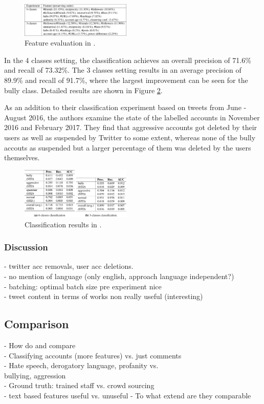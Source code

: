 \documentclass{proseminar}
\begin{document}
\begin{figure}
\centering
\includegraphics[width=0.47\textwidth]{img/twitter_features}
\caption{Feature evaluation in \cite{Twitter:2017}.}
\label{fig:twitter_features}
\end{figure}

In the 4 classes setting, the classification achieves an overall precision of 71.6\% and recall of 73.32\%. The 3 classes setting results in an average precision of 89.9\% and recall of 91.7\%, where the largest improvement can be seen for the bully class. Detailed results are shown in Figure \ref{fig:twitter_results}.

As an addition to their classification experiment based on tweets from June - August 2016, the authors examine the state of the labelled accounts in November 2016 and February 2017. They find that aggressive accounts got deleted by their users as well as suspended by Twitter to some extent, whereas none of the bully accouts as suspended but a larger percentage of them was deleted by the users themselves.

\begin{figure}
\centering
\includegraphics[width=0.47\textwidth]{img/twitter_results}
\caption{Classification results in \cite{Twitter:2017}.}
\label{fig:twitter_results}
\end{figure}

\subsubsection{Discussion} - twitter acc removals, user acc deletions.\\
- no mention of language (only english, approach language independent?)\\
- batching: optimal batch size pre experiment nice\\
- tweet content in terms of works non really useful (interesting)

\subsection{Comparison}
- How do \cite{Yahoo:2016} and \cite{Twitter:2017} compare\\
\hphantom{- }- Classifying accounts (more features) vs. just comments\\
\hphantom{- }- Hate speech, derogatory language, profanity vs.\\
\hphantom{- - }bullying, aggression\\
\hphantom{- }- Ground truth: trained staff vs. crowd sourcing\\
\hphantom{- }- text based features useful vs. unuseful
- To what extend are they comparable
\end{document}
